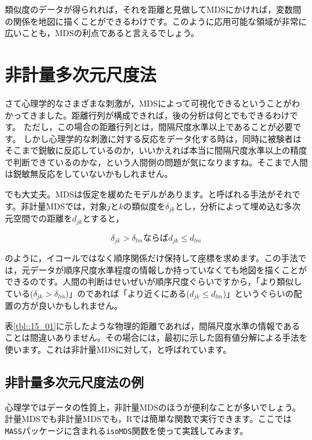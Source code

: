 \documentclass{ltjsbook}
\begin{document}
類似度のデータが得られれば，それを距離と見做してMDSにかければ，変数間の関係を地図に描くことができるわけです。このように応用可能な領域が非常に広いことも，MDSの利点であると言えるでしょう。

\section{非計量多次元尺度法}

さて心理学的なさまざまな刺激が，MDSによって可視化できるということがわかってきました。距離行列が構成できれば，後の分析は何とでもできるわけです。
ただし，この場合の距離行列とは，間隔尺度水準以上であることが必要です。
しかし心理学的な刺激に対する反応をデータ化する時は，同時に被験者はそこまで鋭敏に反応しているのか，いいかえれば本当に間隔尺度水準以上の精度で判断できているのかな，という人間側の問題が気になりますね。そこまで人間は鋭敏無反応をしていないかもしれません。

でも大丈夫。MDSは仮定を緩めたモデルがあります。と呼ばれる手法がそれです。非計量MDSでは，対象$j$と$k$の類似度を$\delta_{jk}$とし，分析によって埋め込む多次元空間での距離を$d_{jk}$とすると，

$$ \delta_{jk} > \delta_{lm} \mbox{ならば}d_{jk}\le d_{lm} $$

のように，イコールではなく順序関係だけ保持して座標を求めます。この手法では，元データが順序尺度水準程度の情報しか持っていなくても地図を描くことができるのです。人間の判断はせいぜいが順序尺度ぐらいですから，「より類似している($\delta_{jk} > \delta_{lm}$)」のであれば「より近くにある($d_{jk}\le d_{lm} $)」というぐらいの配置の方が良いかもしれません。


表\ref{tbl::15_01}に示したような物理的距離であれば，間隔尺度水準の情報であることは間違いありません。その場合には，最初に示した固有値分解による手法を使います。これは非計量MDSに対して，と呼ばれています。

\subsection{非計量多次元尺度法の例}

心理学ではデータの性質上，非計量MDSのほうが便利なことが多いでしょう。計量MDSでも非計量MDSでも，Rでは簡単な関数で実行できます。ここでは\verb|MASS|パッケージに含まれる\verb|isoMDS|関数を使って実践してみます。
\end{document}
